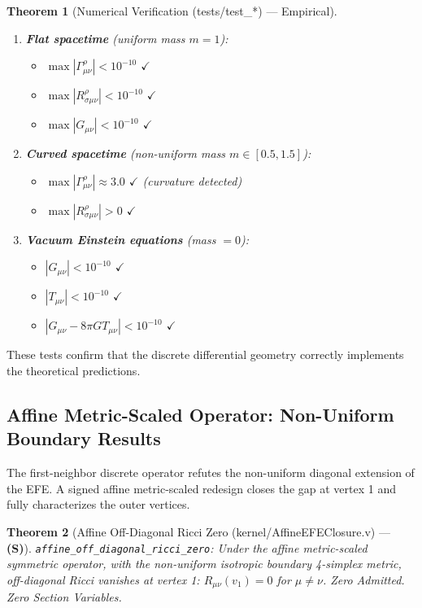 \documentclass[11pt, a4paper]{report}
\theoremstyle{definition}
\theoremstyle{plain}
\newtheorem{theorem}{Theorem}[chapter]
\begin{document}
\begin{theorem}[Numerical Verification {\normalfont (tests/test\_*)} --- Empirical]
\leavevmode
\begin{enumerate}
    \item \textbf{Flat spacetime} (uniform mass $m=1$):
        \begin{itemize}
            \item $\max|\Gamma^\rho_{\mu\nu}| < 10^{-10}$ $\checkmark$
            \item $\max|R^\rho_{\sigma\mu\nu}| < 10^{-10}$ $\checkmark$
            \item $\max|G_{\mu\nu}| < 10^{-10}$ $\checkmark$
        \end{itemize}
    \item \textbf{Curved spacetime} (non-uniform mass $m \in [0.5, 1.5]$):
        \begin{itemize}
            \item $\max|\Gamma^\rho_{\mu\nu}| \approx 3.0$ $\checkmark$ (curvature detected)
            \item $\max|R^\rho_{\sigma\mu\nu}| > 0$ $\checkmark$
        \end{itemize}
    \item \textbf{Vacuum Einstein equations} (mass $= 0$):
        \begin{itemize}
            \item $|G_{\mu\nu}| < 10^{-10}$ $\checkmark$
            \item $|T_{\mu\nu}| < 10^{-10}$ $\checkmark$
            \item $|G_{\mu\nu} - 8\pi G T_{\mu\nu}| < 10^{-10}$ $\checkmark$
        \end{itemize}
\end{enumerate}
\end{theorem}

These tests confirm that the discrete differential geometry correctly implements the theoretical predictions.

\subsection{Affine Metric-Scaled Operator: Non-Uniform Boundary Results}

The first-neighbor discrete operator refutes the non-uniform diagonal extension of the EFE. A signed affine metric-scaled redesign closes the gap at vertex 1 and fully characterizes the outer vertices.

\begin{theorem}[Affine Off-Diagonal Ricci Zero {\normalfont (kernel/AffineEFEClosure.v)} --- \textbf{(S)}]
\texttt{affine\_off\_diagonal\_ricci\_zero}: Under the affine metric-scaled symmetric operator, with the non-uniform isotropic boundary 4-simplex metric, off-diagonal Ricci vanishes at vertex 1: $R_{\mu\nu}(v_1) = 0$ for $\mu \neq \nu$. Zero Admitted. Zero Section Variables.
\end{theorem}
\end{document}
